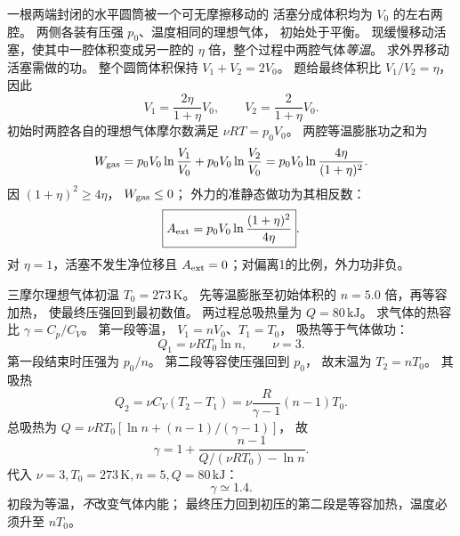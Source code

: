 
一根两端封闭的水平圆筒被一个可无摩擦移动的
活塞分成体积均为 $V_0$ 的左右两腔。
两侧各装有压强 $p_0$、温度相同的理想气体，
初始处于平衡。
现缓慢移动活塞，使其中一腔体积变成另一腔的
$\eta$ 倍，整个过程中两腔气体\emph{等温}。
求外界移动活塞需做的功。
\exsolution
整个圆筒体积保持
$V_1+V_2=2V_0$。
题给最终体积比 $V_1/V_2=\eta$，
因此
\[
V_1=\frac{2\eta}{1+\eta}V_0,\qquad
V_2=\frac2{1+\eta}V_0.
\]
初始时两腔各自的理想气体摩尔数满足
$\nu RT=p_0V_0$。
两腔等温膨胀功之和为
\[
W_{\rm gas}=p_0V_0\ln\frac{V_1}{V_0}
+p_0V_0\ln\frac{V_2}{V_0}
=p_0V_0\ln\frac{4\eta}{(1+\eta)^2}.
\]
因 $(1+\eta)^2\ge4\eta$，
$W_{\rm gas}\le0$；
外力的准静态做功为其相反数：
\[
\boxed{A_{\rm ext}=p_0V_0
\ln\frac{(1+\eta)^2}{4\eta}}.
\]
\excheck 对 $\eta=1$，活塞不发生净位移且
$A_{\rm ext}=0$；对偏离1的比例，外力功非负。

三摩尔理想气体初温
$T_0=273\,\mathrm K$。
先等温膨胀至初始体积的
$n=5.0$ 倍，再等容加热，
使最终压强回到最初数值。
两过程总吸热量为
$Q=80\,\mathrm{kJ}$。
求气体的热容比
$\gamma=C_p/C_V$。
\exsolution
第一段等温，
$V_1=nV_0$、$T_1=T_0$，
吸热等于气体做功：
\[
Q_1=\nu RT_0\ln n,\qquad \nu=3.
\]
第一段结束时压强为 $p_0/n$。
第二段等容使压强回到 $p_0$，
故末温为 $T_2=nT_0$。
其吸热
\[
Q_2=\nu C_V(T_2-T_1)
=\nu\frac R{\gamma-1}(n-1)T_0.
\]
总吸热为
$Q=\nu RT_0[\ln n+(n-1)/(\gamma-1)]$，
故
\[
\boxed{\gamma
=1+\frac{n-1}{Q/(\nu RT_0)-\ln n}}.
\]
代入
$\nu=3,T_0=273\,\mathrm K,n=5,Q=80\,\mathrm{kJ}$：
\[
\boxed{\gamma\simeq1.4}.
\]
\excheck 初段为等温，\emph{不}改变气体内能；
最终压力回到初压的第二段是等容加热，温度必须升至
$nT_0$。

